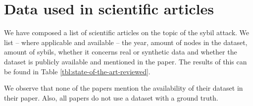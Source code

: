 \section{Data used in scientific articles}
	
	We have composed a list of scientific articles on the topic of the sybil attack. 
	We list -- where applicable and available -- the year, amount of nodes in the dataset, amount of sybils, whether it concerns real or synthetic data and whether the dataset is publicly available and mentioned in the paper.
	The results of this can be found in Table \ref{tbl:state-of-the-art-reviewed}.
	
	We observe that none of the papers mention the availability of their dataset in their paper. 
	Also, all papers do not use a dataset with a ground truth.
	
